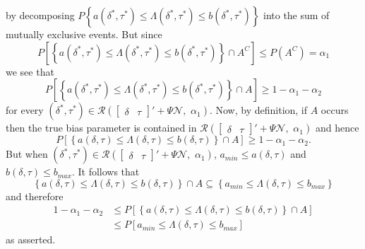 \documentclass[11pt]{article}
\begin{document}
by decomposing $P\left\{ a(\delta^{*}, \tau^{*}) \leq \Lambda(\delta^{*}, \tau^{*}) \leq b(\delta^{*}, \tau^{*})  \right\}$ into the sum of mutually exclusive events. But since 
\[
P\left[\left\{ a(\delta^{*}, \tau^{*}) \leq \Lambda(\delta^{*}, \tau^{*}) \leq b(\delta^{*}, \tau^{*})  \right\} \cap A^C \right] \leq P(A^C) = \alpha_1
\]
we see that
\[
P\left[\left\{ a(\delta^{*}, \tau^{*}) \leq \Lambda(\delta^{*}, \tau^{*}) \leq b(\delta^{*}, \tau^{*})  \right\} \cap A \right] \geq 1- \alpha_1 - \alpha_2
\]
for every $ (\delta^{*}, \tau^{*}) \in  \mathscr{R} \left( \begin{bmatrix}
\delta & \tau
\end{bmatrix}' + \Psi \mathscr{N}, \,\, \alpha_1 \right)$. Now, by definition, if $A$ occurs then the true bias parameter is contained in $ \mathscr{R} \left( \begin{bmatrix}
\delta & \tau
\end{bmatrix}' + \Psi \mathscr{N}, \,\, \alpha_1 \right)$ and hence 
\[
P\left[\left\{ a(\delta, \tau) \leq \Lambda(\delta, \tau) \leq b(\delta, \tau)  \right\} \cap A \right] \geq 1- \alpha_1 - \alpha_2.
\]
But when $ (\delta^{*}, \tau^{*}) \in  \mathscr{R} \left( \begin{bmatrix}
\delta & \tau
\end{bmatrix}' + \Psi \mathscr{N}, \,\, \alpha_1 \right)$, $a_{min} \leq a(\delta, \tau)$ and $b(\delta, \tau) \leq b_{max}$. It follows that 
\[
\left \{ a(\delta, \tau) \leq \Lambda (\delta, \tau) \leq b(\delta, \tau) \right \} \cap A \subseteq \left\{ a_{min} \leq \Lambda (\delta, \tau) \leq b_{max}\right \}
\]
and therefore
\begin{align*}
1-\alpha_1 - \alpha_2 &\leq P\left[\left \{ a(\delta, \tau) \leq \Lambda (\delta, \tau) \leq b(\delta, \tau) \right \} \cap A  \right]\\
&\leq P\left[ a_{min} \leq \Lambda(\delta, \tau) \leq b_{max} \right]
\end{align*}
as asserted.
\end{document}
